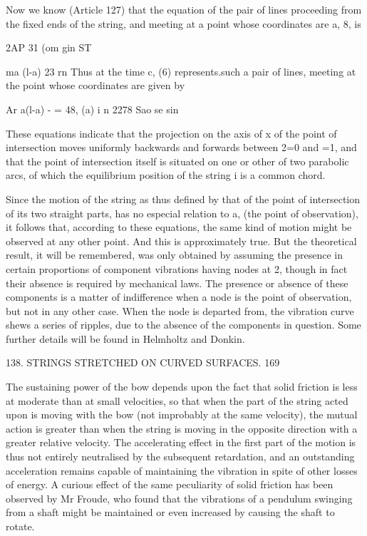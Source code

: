 Now we know (Article 127) that the equation of the pair of lines proceeding
from the fixed ends of the string, and meeting at a point whose coordinates are
a, 8, is

2AP 31 (om gin ST

ma (l-a) 23 rn Thus at the time c, (6) represents.such a pair of lines, meeting
at the point whose coordinates are given by

Ar a(l-a) - = 48, (a) i n 2278 Sao se sin

These equations indicate that the projection on the axis of x of the point of
intersection moves uniformly backwards and forwards between 2=0 and =1, and
that the point of intersection itself is situated on one or other of two
parabolic arcs, of which the equilibrium position of the string i is a common
chord.

Since the motion of the string as thus defined by that of the point of
intersection of its two straight parts, has no especial relation to a, (the
point of observation), it follows that, according to these equations, the same
kind of motion might be observed at any other point.  And this is approximately
true. But the theoretical result, it will be remembered, was only obtained by
assuming the presence in certain proportions of component vibrations having
nodes at 2, though in fact their absence is required by mechanical laws. The
presence or absence of these components is a matter of indifference when a node
is the point of observation, but not in any other case. When the node is
departed from, the vibration curve shews a series of ripples, due to the
absence of the components in question. Some further details will be found in
Helmholtz and Donkin.

138. STRINGS STRETCHED ON CURVED SURFACES. 169

The sustaining power of the bow depends upon the fact that solid friction is
less at moderate than at small velocities, so that when the part of the string
acted upon is moving with the bow (not improbably at the same velocity), the
mutual action is greater than when the string is moving in the opposite
direction with a greater relative velocity. The accelerating effect in the
first part of the motion is thus not entirely neutralised by the subsequent
retardation, and an outstanding acceleration remains capable of maintaining the
vibration in spite of other losses of energy. A curious effect of the same
peculiarity of solid friction has been observed by Mr Froude, who found that
the vibrations of a pendulum swinging from a shaft might be maintained or even
increased by causing the shaft to rotate.

